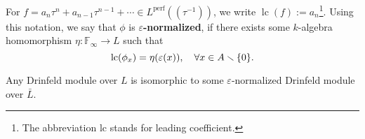\documentclass{article}
\newcommand{\F}{\mathbb{F}}
\newcommand{\perf}{\mathrm{perf}}
\newcommand{\llpar}{(\!(}
\newcommand{\rrpar}{)\!)}
\DeclareMathOperator{\lc}{lc}
\begin{document}


For $f = a_n\tau^n + a_{n-1}\tau^{n-1} + \cdots\in L^\perf\llpar\tau^{-1}\rrpar$, we write $\lc(f) := a_n$\footnote{The abbreviation lc stands for leading coefficient.}.
Using this notation, we say that $\phi$ is $\varepsilon$\textbf{-normalized},
if there exists some $k$-algebra homomorphism
$\eta : \F_\infty\to L$ such that
\[\lc(\phi_x) = \eta(\varepsilon(x)),\quad\forall x\in A\sminus\{0\}.\]

\begin{lemma}\label{Drinfeld module are sign-normalized up to isomophism over algebraic closure}
    Any Drinfeld module over $L$ is isomorphic to some $\varepsilon$-normalized Drinfeld module over $\bar{L}$.
\end{lemma}
\end{document}
